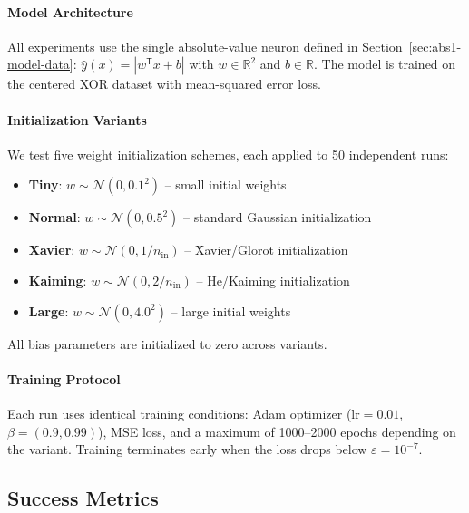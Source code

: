 \paragraph{Model Architecture}
All experiments use the single absolute-value neuron defined in Section~\ref{sec:abs1-model-data}: $\hat{y}(x) = |w^{\mathsf{T}}x + b|$ with $w \in \mathbb{R}^2$ and $b \in \mathbb{R}$. The model is trained on the centered XOR dataset with mean-squared error loss.

\paragraph{Initialization Variants}
We test five weight initialization schemes, each applied to 50 independent runs:
\begin{itemize}
   \item \textbf{Tiny}: $w \sim \mathcal{N}(0, 0.1^2)$ -- small initial weights
   \item \textbf{Normal}: $w \sim \mathcal{N}(0, 0.5^2)$ -- standard Gaussian initialization  
   \item \textbf{Xavier}: $w \sim \mathcal{N}(0, 1/n_{\text{in}})$ -- Xavier/Glorot initialization
   \item \textbf{Kaiming}: $w \sim \mathcal{N}(0, 2/n_{\text{in}})$ -- He/Kaiming initialization
   \item \textbf{Large}: $w \sim \mathcal{N}(0, 4.0^2)$ -- large initial weights
\end{itemize}
All bias parameters are initialized to zero across variants.

\paragraph{Training Protocol}
Each run uses identical training conditions: Adam optimizer ($\text{lr}=0.01$, $\beta=(0.9, 0.99)$), MSE loss, and a maximum of 1000--2000 epochs depending on the variant. Training terminates early when the loss drops below $\varepsilon = 10^{-7}$.


\subsection*{Success Metrics}

